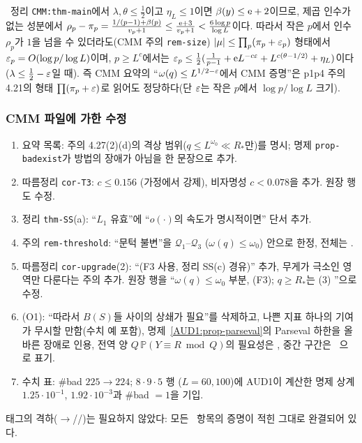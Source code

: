 \begin{remark}\label{AUD1:rem-smallp}
\PROVED\ 정리 \texttt{CMM:thm-main}에서 $\lambda,\theta\le\frac12$이고 $\eta_L\le1$이면 $\beta(y)\le\mathrm{e}+2$이므로, 제곱 인수가 없는 성분에서
$\rho_p-\pi_p=\frac{1/(p-1)+\beta(p)}{v_p+1}\le\frac{\mathrm{e}+3}{v_p+1}<\frac{6\log p}{\log L}$이다. 따라서 작은 $p$에서 인수 $\rho_p$가 $1$을 넘을 수 있더라도(CMM 주의 \texttt{rem-size})
$|\mu|\le\prod_p(\pi_p+\varepsilon_p)$ 형태에서 $\varepsilon_p=O(\log p/\log L)$이며, $p\ge L^{c}$에서는 $\varepsilon_p\le\frac12(\frac1{p-1}+\mathrm{e} L^{-c\varepsilon}+L^{c(\theta-1/2)}+\eta_L)$이다
($\lambda\le\frac12-\varepsilon$일 때). 즉 CMM 요약의 ``$\omega(q)\le L^{1/2-\varepsilon}$에서 CMM 증명''은 p1p4 주의 4.21의 형태 $\prod(\pi_p+\varepsilon)$로 읽어도 정당하다(단 $\varepsilon$는 작은 $p$에서 $\log p/\log L$ 크기).
\end{remark}

\subsubsection{CMM 파일에 가한 수정}\label{AUD1:ssec-edits}
\begin{enumerate}[label=(E\arabic*),leftmargin=2.5em]
\item 요약 목록: 주의 4.27(2)(d)의 격상 범위($q\le L^{\omega_0}\ll R_*$만)를 명시; 명제 \texttt{prop-badexist}가 방법의 장애가 아님을 한 문장으로 추가.
\item 따름정리 \texttt{cor-T3}: $c\le0.156$ (가정에서 강제), 비자명성 $c<0.078$을 추가. 원장 행도 수정.
\item 정리 \texttt{thm-SS}(a): ``$L_1$ 유효''에 ``$o(\cdot)$의 속도가 명시적이면'' 단서 추가.
\item 주의 \texttt{rem-threshold}: ``문턱 불변''을 $\mathcal Q_1$--$\mathcal Q_3$ ($\omega(q)\le\omega_0$) 안으로 한정, 전체는 \OPEN.
\item 따름정리 \texttt{cor-upgrade}(2): ``(F3 사용, 정리 SS(c) 경유)'' 추가, 무게가 극소인 영역만 다룬다는 주의 추가. 원장 행을 ``$\omega(q)\le\omega_0$ 부분, (F3); $q\ge R_*$는 (3) \OPEN''으로 수정.
\item (O1): ``따라서 $B(S)$들 사이의 상쇄가 필요''를 삭제하고, 나쁜 지표 하나의 기여가 무시할 만함(수치 예 포함), 명제~\ref{AUD1:prop-parseval}의 Parseval 하한을 올바른 장애로 인용, 전역 양 $Q\,\mathbb P(Y\equiv R\bmod Q)$의 필요성은 \HEUR, 중간 구간은 \OPEN\ 으로 표기.
\item 수치 표: \#bad $225\to224$; $8\cdot9\cdot5$ 행 ($L=60,100$)에 AUD1이 계산한 명제 상계 $1.25\cdot10^{-1}$, $1.92\cdot10^{-3}$과 \#bad $=1$을 기입.
\end{enumerate}
태그의 격하(\PROVED$\to$\COND{}/\HEUR/\OPEN)는 필요하지 않았다: 모든 \PROVED\ 항목의 증명이 적힌 그대로 완결되어 있다.

